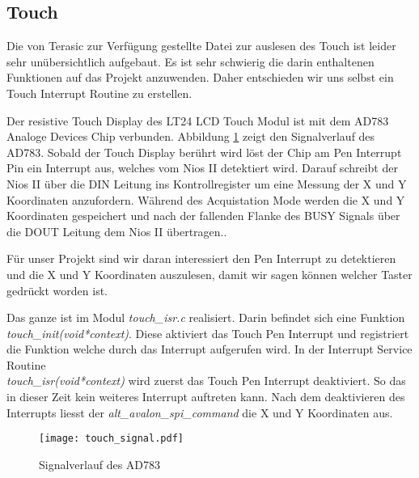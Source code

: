 \subsection{Touch}\label{subsec:touch}
 Die von Terasic zur Verfügung gestellte Datei zur auslesen des Touch ist leider sehr unübersichtlich aufgebaut. Es ist sehr schwierig die darin enthaltenen Funktionen auf das Projekt anzuwenden. Daher entschieden wir uns selbst ein Touch Interrupt Routine zu erstellen. 
 
 Der resistive Touch Display des LT24 LCD Touch Modul ist mit dem AD783 Analoge Devices Chip verbunden. Abbildung \ref{img:AD783_Signalverlauf} zeigt den Signalverlauf des AD783.  Sobald der Touch Display berührt wird löst der Chip am Pen Interrupt Pin ein Interrupt aus, welches vom Nios II detektiert wird. Darauf schreibt der Nios II über die DIN Leitung ins Kontrollregister um eine Messung der X und Y Koordinaten anzufordern. Während des Acquistation Mode werden die X und Y Koordinaten gespeichert und nach der fallenden Flanke des BUSY Signals über die DOUT Leitung dem Nios II übertragen.\cite{AD7843}. 
 
 Für unser Projekt sind wir daran interessiert den Pen Interrupt zu detektieren und die X und Y Koordinaten auszulesen, damit wir sagen können welcher Taster gedrückt worden ist.
 
Das ganze ist im Modul \textit{touch\_isr.c} realisiert. Darin befindet sich eine Funktion \\ \textit{touch\_init(void*context)}. Diese aktiviert das Touch Pen Interrupt  und registriert die Funktion welche durch das Interrupt aufgerufen wird. 
In der Interrupt Service Routine\\ \textit{touch\_isr(void*context)} wird zuerst das Touch Pen Interrupt  deaktiviert. So das in dieser Zeit kein weiteres Interrupt auftreten kann. Nach dem deaktivieren des Interrupts liesst der \textit{alt\_avalon\_spi\_command} die X und Y Koordinaten aus.

\begin{figure}[h!]
	\centering
	\texttt{[image: touch\_signal.pdf]}
	\caption{Signalverlauf des AD783} 
	\label{img:AD783_Signalverlauf}
\end{figure}  